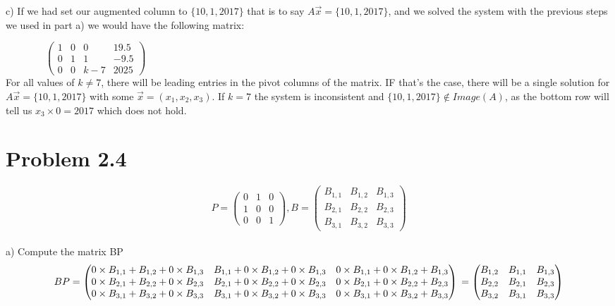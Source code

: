 \documentclass{article}
\begin{document}
c) If we had set our augmented column to $\{10,1,2017\}$ that is to say $A\vec{x} = \{10,1,2017\}$, and we solved the system with the previous steps we used in part a) we would have the following matrix:
 
  \( \qquad \qquad \begin{pmatrix}
    1 & 0 & 0 & 19.5 \\
    0 & 1 & 1 & -9.5\\
    0 & 0 & k-7 & 2025 
\end{pmatrix} 
 \) \\
 
For all values of $k\neq 7$, there will be leading entries in the pivot columns of the matrix. IF that's the case, there will be a single solution for $A\vec{x} = \{10,1,2017\}$ with some $\vec{x} = (x_1,x_2,x_3)$. If $k=7$ the system is inconsistent and $\{10,1,2017\} \notin Image(A)$, as the bottom row will tell us $x_3 \times 0 = 2017$ which does not hold.

\break
\section{Problem 2.4}
\begin{equation}
    P = 
    \begin{pmatrix}
    0 & 1 & 0\\
    1 & 0 & 0 \\
    0 & 0 & 1 
    \end{pmatrix},
    B = 
    \begin{pmatrix}
    B_{1,1} & B_{1,2} & B_{1,3}\\
    B_{2,1} & B_{2,2} & B_{2,3} \\
    B_{3,1} & B_{3,2} & B_{3,3} 
    \end{pmatrix}
\end{equation}
\\

a) Compute the matrix BP
\begin{equation}
    BP = 
    \begin{pmatrix}
    0\times B_{1,1} + B_{1,2} + 0\times B_{1,3} & B_{1,1} + 0\times B_{1,2} + 0\times  B_{1,3}  & 0\times B_{1,1} + 0\times B_{1,2} + B_{1,3}\\
    0 \times B_{2,1} + B_{2,2} + 0\times B_{2,3} & B_{2,1} + 0\times B_{2,2} + 0\times  B_{2,3}  & 0\times B_{2,1} + 0\times B_{2,2} + B_{2,3}\\
    0 \times B_{3,1} + B_{3,2} + 0\times B_{3,3} & B_{3,1} + 0\times B_{3,2} + 0\times  B_{3,3}  & 0\times B_{3,1} + 0\times B_{3,2} + B_{3,3}
    \end{pmatrix} 
    \newline
    =
    \begin{pmatrix}
    B_{1,2} & B_{1,1} & B_{1,3}\\
    B_{2,2} & B_{2,1} & B_{2,3}\\
    B_{3,2} & B_{3,1} & B_{3,3}\\
    \end{pmatrix}
\end{equation}
\\
\end{document}
